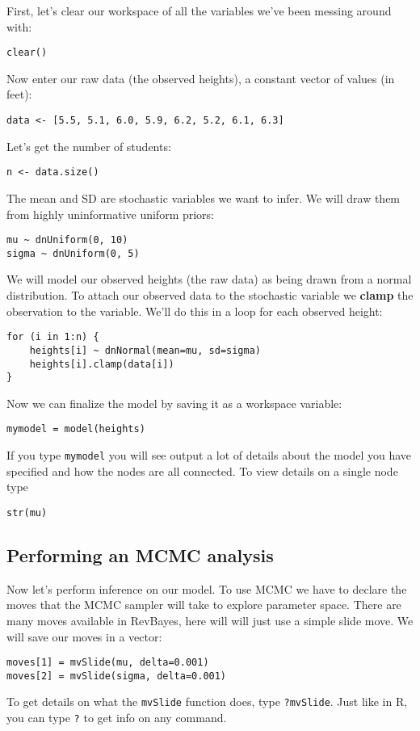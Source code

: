 \documentclass[11pt]{article}
\begin{document}
First, let's clear our workspace of all the variables we've been messing around with:
\begin{verbatim}
clear()
\end{verbatim}
Now enter our raw data (the observed heights), a constant vector of values (in feet):
\begin{verbatim}
data <- [5.5, 5.1, 6.0, 5.9, 6.2, 5.2, 6.1, 6.3]
\end{verbatim}
Let's get the number of students:
\begin{verbatim}
n <- data.size()
\end{verbatim}
The mean and SD are stochastic variables we want to infer.
We will draw them from highly uninformative
uniform priors:
\begin{verbatim}
mu ~ dnUniform(0, 10)
sigma ~ dnUniform(0, 5)
\end{verbatim}
We will model our observed heights (the raw data)
as being drawn from a normal distribution.
To attach our observed data to the stochastic variable
we \textbf{clamp} the observation to the variable.
We'll do this in a loop for each observed height:
\begin{verbatim}
for (i in 1:n) {
    heights[i] ~ dnNormal(mean=mu, sd=sigma)
    heights[i].clamp(data[i])
}
\end{verbatim}
Now we can finalize the model by saving it as a workspace variable:
\begin{verbatim}
mymodel = model(heights)
\end{verbatim}
If you type \texttt{mymodel} you will see
output a lot of details about the model you have specified
and how the nodes are all connected.
To view details on a single node type
\begin{verbatim}
str(mu)
\end{verbatim}

\subsection{Performing an MCMC analysis}

Now let's perform inference on our model.
To use MCMC we have to declare the moves that the MCMC
sampler will take to explore parameter space.
There are many moves available in RevBayes,
here will will just use a simple slide move.
We will save our moves in a vector:
\begin{verbatim}
moves[1] = mvSlide(mu, delta=0.001)
moves[2] = mvSlide(sigma, delta=0.001)
\end{verbatim}
To get details on what the \texttt{mvSlide}
function does, type \texttt{?mvSlide}.
Just like in R, you can type \texttt{?} to get info on any command.
\end{document}
